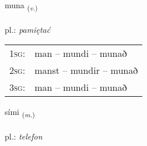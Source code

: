 \documentclass[frontgrid, backgrid]{flacards}\usepackage[]{graphicx}\usepackage[]{xcolor}
\begin{document}
\renewcommand{\flhead}{\vskip5pt \fboxsep=0pt {\small\bfseries\footnotesize Sagnorð | Verb}}
\renewcommand{\fcfoot}{\vskip5pt \fboxsep=0pt \hspace{2pt}{\small\bfseries\footnotesize 1K}}

\renewcommand{\blhead}{\vskip5pt {\small\bfseries\footnotesize Sagnorð | Verb }}
\renewcommand{\bcfoot}{\vskip5pt \hspace{2pt}{\small\bfseries\footnotesize 1K}}


{muna \small{\textsubscript{(\textit{v.})}} \\[1ex] %
\textphonetic{[mʏːna]} \\
pl.: \emph{pamiętać} \\  [2ex]
\renewcommand*{\arraystretch}{0.8}
\begin{tabular}{p{1cm}l}
\textsc{1sg}: & man -- mundi -- munað \\ 
\textsc{2sg}: & manst -- mundir -- munað \\ 
\textsc{3sg}: & man -- mundi -- munað \\ 
\end{tabular}
}

\renewcommand{\flhead}{\vskip5pt \fboxsep=0pt {\small\bfseries\footnotesize Nafnorð | Noun}}
\renewcommand{\fcfoot}{\vskip5pt \fboxsep=0pt \hspace{2pt}{\small\bfseries\footnotesize 1K}}

\renewcommand{\blhead}{\vskip5pt {\small\bfseries\footnotesize Nafnorð | Noun }}
\renewcommand{\bcfoot}{\vskip5pt \hspace{2pt}{\small\bfseries\footnotesize 1K}}


{sími \small{\textsubscript{(\textit{m.})}} \\[1ex] %
\textphonetic{[siːmɪ]} \\
pl.: \emph{telefon} \\  [2ex]
\renewcommand*{\arraystretch}{0.8}
}
\end{document}
